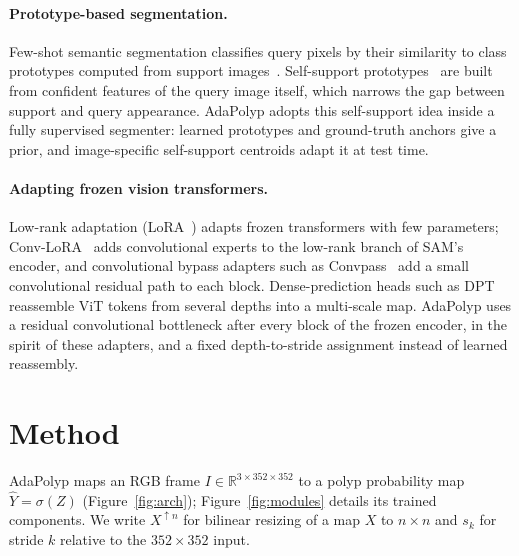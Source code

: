 \documentclass{ieeeaccess}
\begin{document}
\paragraph{Prototype-based segmentation.} Few-shot semantic segmentation classifies query pixels by their similarity to class prototypes computed from support images~\cite{wang2019panet}. Self-support prototypes~\cite{fan2022ssp} are built from confident features of the query image itself, which narrows the gap between support and query appearance. AdaPolyp adopts this self-support idea inside a fully supervised segmenter: learned prototypes and ground-truth anchors give a prior, and image-specific self-support centroids adapt it at test time.

\paragraph{Adapting frozen vision transformers.} Low-rank adaptation (LoRA~\cite{hu2022lora}) adapts frozen transformers with few parameters; Conv-LoRA~\cite{zhong2024convlora} adds convolutional experts to the low-rank branch of SAM's encoder, and convolutional bypass adapters such as Convpass~\cite{jie2022convpass} add a small convolutional residual path to each block. Dense-prediction heads such as DPT~\cite{ranftl2021vision} reassemble ViT tokens from several depths into a multi-scale map. AdaPolyp uses a residual convolutional bottleneck after every block of the frozen encoder, in the spirit of these adapters, and a fixed depth-to-stride assignment instead of learned reassembly.

\section{Method}
AdaPolyp maps an RGB frame $I\in\mathbb{R}^{3\times352\times352}$ to a polyp probability map $\hat Y=\sigma(Z)$ (Figure~\ref{fig:arch}); Figure~\ref{fig:modules} details its trained components. We write $X^{\uparrow n}$ for bilinear resizing of a map $X$ to $n\times n$ and $s_k$ for stride $k$ relative to the $352\times352$ input.
\end{document}
